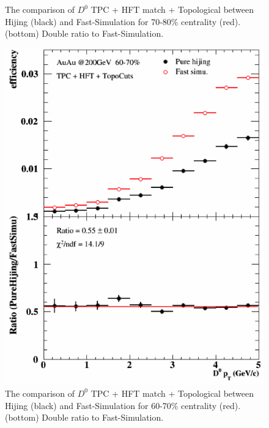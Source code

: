 \begin{figure}[htbp]
\begin{minipage}[htbp]{0.47\linewidth}
\caption{ The comparison of $D^0$ TPC + HFT match + Topological between Hijing (black) and Fast-Simulation for 70-80\% centrality (red). (bottom) Double ratio to Fast-Simulation.\label{70_80}}
\end{minipage}
\hfill
\begin{minipage}[htbp]{0.47\linewidth}
\centering
\includegraphics[width=1.0\textwidth,angle=0]{figure/Run14_D0HFT/60_70.png} 
\caption{ The comparison of $D^0$ TPC + HFT match + Topological between Hijing (black) and Fast-Simulation for 60-70\% centrality (red). (bottom) Double ratio to Fast-Simulation.\label{60_70}}
\end{minipage}
\end{figure}


